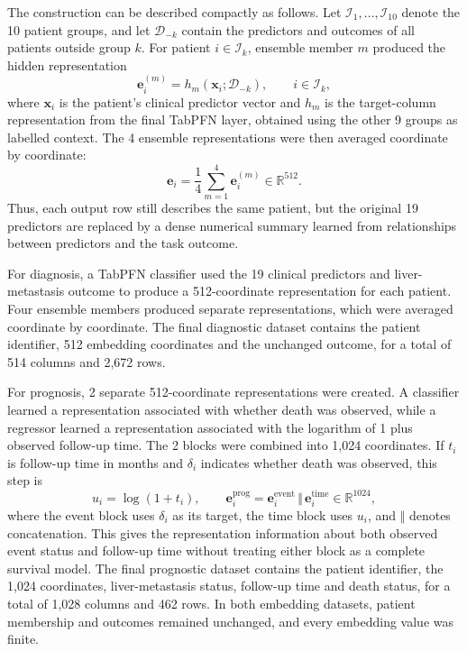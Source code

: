 The construction can be described compactly as follows. Let
$\mathcal{I}_1,\ldots,\mathcal{I}_{10}$ denote the 10 patient groups, and let
$\mathcal{D}_{-k}$ contain the predictors and outcomes of all patients outside
group $k$. For patient $i\in\mathcal{I}_k$, ensemble member $m$ produced the
hidden representation
\begin{equation}
  \mathbf{e}^{(m)}_i = h_m\!\left(\mathbf{x}_i;\mathcal{D}_{-k}\right),
  \qquad i\in\mathcal{I}_k,
  \label{eq:transforms:oof-embedding}
\end{equation}
where $\mathbf{x}_i$ is the patient's clinical predictor vector and $h_m$ is the
target-column representation from the final TabPFN layer, obtained using the
other 9 groups as labelled context. The 4 ensemble representations were then
averaged coordinate by coordinate:
\begin{equation}
  \mathbf{e}_i = \frac{1}{4}\sum_{m=1}^{4}\mathbf{e}^{(m)}_i
  \in\mathbb{R}^{512}.
  \label{eq:transforms:ensemble-embedding}
\end{equation}
Thus, each output row still describes the same patient, but the original 19
predictors are replaced by a dense numerical summary learned from relationships
between predictors and the task outcome.

For diagnosis, a TabPFN classifier used the 19 clinical predictors and
liver-metastasis outcome to produce a 512-coordinate representation for each
patient. Four ensemble members produced separate representations, which were
averaged coordinate by coordinate. The final diagnostic dataset contains the
patient identifier, 512 embedding coordinates and the unchanged outcome, for a
total of 514 columns and 2,672 rows.

For prognosis, 2 separate 512-coordinate representations were created. A
classifier learned a representation associated with whether death was observed,
while a regressor learned a representation associated with the logarithm of
1 plus observed follow-up time. The 2 blocks were combined into 1,024 coordinates.
If $t_i$ is follow-up time in months and $\delta_i$ indicates whether death was
observed, this step is
\begin{equation}
  u_i=\log(1+t_i), \qquad
  \mathbf{e}^{\mathrm{prog}}_i =
  \mathbf{e}^{\mathrm{event}}_i\,\Vert\,
  \mathbf{e}^{\mathrm{time}}_i \in\mathbb{R}^{1024},
  \label{eq:transforms:prognostic-embedding}
\end{equation}
where the event block uses $\delta_i$ as its target, the time block uses $u_i$,
and $\Vert$ denotes concatenation. This gives the representation information
about both observed event status and follow-up time without treating either
block as a complete survival model.
The final prognostic dataset contains the patient identifier, the 1,024
coordinates, liver-metastasis status, follow-up time and death status, for a total
of 1,028 columns and 462 rows. In both embedding datasets, patient membership and
outcomes remained unchanged, and every embedding value was finite.

